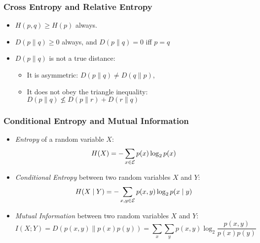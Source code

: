 \begin{frame}
\frametitle{Cross Entropy and Relative Entropy}
\begin{itemize}[<+->]
\item $H(p,q) \geq H(p)$ always.
\item $D(p \| q) \geq 0$ always, and $D(p \| q) = 0$ iff $p = q$
\item $D(p \| q)$ is not a true distance: 
  \begin{itemize}
  \item It is asymmetric: $D(p \| q) \neq D(q \| p)$, 
  \item It does not obey the triangle inequality: $D(p \| q) \nleq D(p \| r) + D(r \| q)$
  \end{itemize}
\end{itemize}

\end{frame}

\begin{frame}
\frametitle{Conditional Entropy and Mutual Information}
\begin{itemize}[<+->]
\item {\it Entropy} of a random variable $X$:
\[ H(X) = - \sum_{x \in {\cal E}} p(x) \log_2 p(x) \]
\item {\it Conditional Entropy} between two random variables $X$ and $Y$:
\[ H(X \mid Y) = - \sum_{x,y \in {\cal E}} p(x,y) \log_2 p(x
\mid y) \]
\item {\it Mutual Information} between two random variables $X$ and $Y$:
\[ I(X;Y) = D(p(x,y) \| p(x)p(y)) = \sum_x \sum_y p(x,y) \log_2
\frac{p(x,y)}{p(x)p(y)} \]
\end{itemize}

\end{frame}

\begin{comment}
\section*{Appendix: Computing with Log Probability}

\begin{frame}[fragile]
\frametitle{Log Probability Arithmetic}
\begin{center}
\begin{verbatim}
// In Python: use numpy.logaddexp2(x1,x2) for base 2
// computes log(a + b) given log(a) and log(b)
double logadd(double lna, double lnb)
{
    if (lna == 1.0) return lnb;
    if (lnb == 1.0) return lna;
    double diff = lna - lnb;
    // 500 is log of large constant
    if (diff < 500.0) 
        return log1p(exp(diff)) + lnb;
        // log1p(x) computes log(1+x)
    else
        return lna;
}
\end{verbatim} 
\end{center}
\end{frame}
\end{comment}






